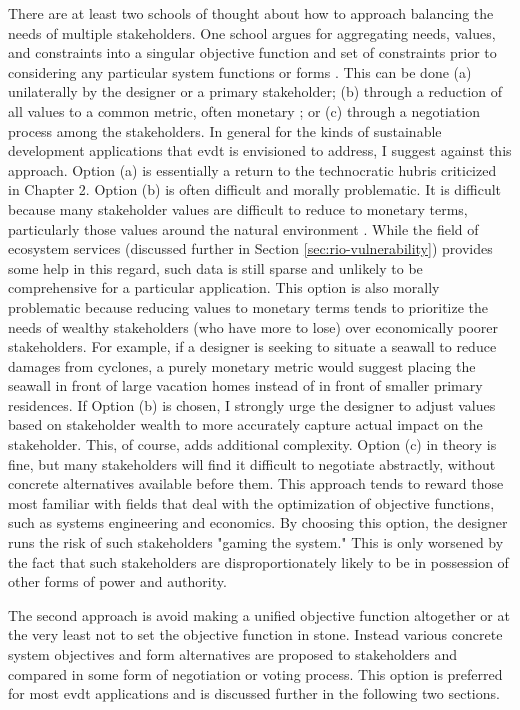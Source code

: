There are at least two schools of thought about how to approach balancing the needs of multiple stakeholders. One school argues for aggregating needs, values, and constraints into a singular objective function and set of constraints prior to considering any particular system functions or forms \cite{hazelriggFundamentalsDecisionMaking2012}. This can be done (a) unilaterally by the designer or a primary stakeholder; (b) through a reduction of all values to a common metric, often monetary \cite{viscusiEconomicsRegulationAntitrust2018}; or (c) through a negotiation process among the stakeholders. In general for the kinds of sustainable development applications that \ac{evdt} is envisioned to address, I suggest against this approach. Option (a) is essentially a return to the technocratic hubris criticized in Chapter 2. Option (b) is often difficult and morally problematic. It is difficult because many stakeholder values are difficult to reduce to monetary terms, particularly those values around the natural environment \cite{ackermanPricingPricelessCostBenefit2001}. While the field of ecosystem services (discussed further in Section \ref{sec:rio-vulnerability}) provides some help in this regard, such data is still sparse and unlikely to be comprehensive for a particular application. This option is also morally problematic because reducing values to monetary terms tends to prioritize the needs of wealthy stakeholders (who have more to lose) over economically poorer stakeholders. For example, if a designer is seeking to situate a seawall to reduce damages from cyclones, a purely monetary metric would suggest placing the seawall in front of large vacation homes instead of in front of smaller primary residences. If Option (b) is chosen, I strongly urge the designer to adjust values based on stakeholder wealth to more accurately capture actual impact on the stakeholder. This, of course, adds additional complexity. Option (c) in theory is fine, but many stakeholders will find it difficult to negotiate abstractly, without concrete alternatives available before them. This approach tends to reward those most familiar with fields that deal with the optimization of objective functions, such as systems engineering and economics. By choosing this option, the designer runs the risk of such stakeholders "gaming the system." This is only worsened by the fact that such stakeholders are disproportionately likely to be in possession of other forms of power and authority.

The second approach is avoid making a unified objective function altogether or at the very least not to set the objective function in stone. Instead various concrete system objectives and form alternatives are proposed to stakeholders and compared in some form of negotiation or voting process. This option is preferred for most \ac{evdt} applications and is discussed further in the following two sections.  


